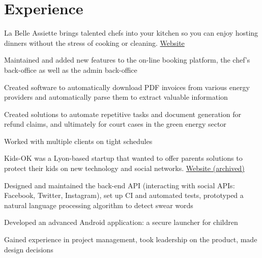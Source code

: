 \documentclass[
  english,
  letterpaper
]{resume-openfont}
\begin{document}
\begin{minipage}[t]{0.66\textwidth}


\section{Experience}
%
%
La Belle Assiette brings talented chefs into your kitchen so you can enjoy hosting dinners without the stress of cooking or cleaning. \href{https://labelleassiette.co.uk}{Website}
\vspace{1.5\topsep} %
\begin{tightemize}
\item Maintained and added new features to the on-line booking platform, the chef's back-office as well as the admin back-office
\end{tightemize}
\sectionsep

%
%
\vspace{\topsep}
\begin{tightemize}
\item Created software to automatically download PDF invoices from various energy providers and automatically parse them to extract valuable information
\item Created solutions to automate repetitive tasks and document generation for refund claims, and ultimately for court cases in the green energy sector
\item Worked with multiple clients on tight schedules
\end{tightemize}
\sectionsep

%
%
Kids-OK was a Lyon-based startup that wanted to offer parents solutions to protect their kids on new technology and social networks. \href{https://i.imgur.com/ZAXWuZN.png}{Website (archived)}
\vspace{\topsep}
\begin{tightemize}
\item Designed and maintained the back-end API (interacting with social APIs: Facebook, Twitter, Instagram), set up CI and automated tests, prototyped a natural language processing algorithm to detect swear words
\item Developed an advanced Android application: a secure launcher for children
\item Gained experience in project management, took leadership on the product, made design decisions
\end{tightemize}
\sectionsep


\end{minipage}
\end{document}
